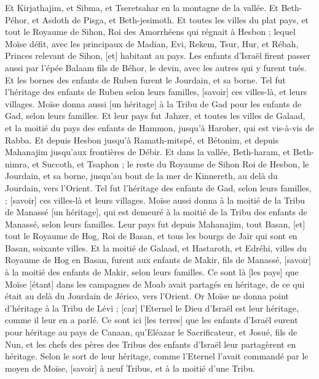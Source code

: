 \begin{multicols}{2}
Et Kirjathajim, et Sibma, et Tseretsahar en la montagne de la vallée.
Et Beth-Péhor, et Asdoth de Pisga, et Beth-jesimoth.
Et toutes les villes du plat pays, et tout le Royaume de Sihon, Roi des Amorrhéens qui régnait à Hesbon ; lequel Moïse défit, avec les principaux de Madian, Evi, Rekem, Tsur, Hur, et Rébah, Princes relevant de Sihon, [et] habitant au pays.
Les enfants d'Israël firent passer aussi par l'épée Balaam fils de Béhor, le devin, avec les autres qui y furent tués.
Et les bornes des enfants de Ruben furent le Jourdain, et sa borne. Tel fut l'héritage des enfants de Ruben selon leurs familles, [savoir] ces villes-là, et leurs villages.
Moïse donna aussi [un héritage] à la Tribu de Gad pour les enfants de Gad, selon leurs familles.
Et leur pays fut Jahzer, et toutes les villes de Galaad, et la moitié du pays des enfants de Hammon, jusqu'à Haroher, qui est vis-à-vis de Rabba.
Et depuis Hesbon jusqu'à Ramath-mitspé, et Bétonim, et depuis Mahanajim jusqu'aux frontières de Débir.
Et dans la vallée, Beth-haram, et Beth-nimra, et Succoth, et Tsaphon ; le reste du Royaume de Sihon Roi de Hesbon, le Jourdain, et sa borne, jusqu'au bout de la mer de Kinnereth, au delà du Jourdain, vers l'Orient.
Tel fut l'héritage des enfants de Gad, selon leurs familles, ; [savoir] ces villes-là et leurs villages.
Moïse aussi donna à la moitié de la Tribu de Manassé [un héritage], qui est demeuré à la moitié de la Tribu des enfants de Manassé, selon leurs familles.
Leur pays fut depuis Mahanajim, tout Basan, [et] tout le Royaume de Hog, Roi de Basan, et tous les bourgs de Jaïr qui sont en Basan, soixante villes.
Et la moitié de Galaad, et Hastaroth, et Edréhi, villes du Royaume de Hog en Basan, furent aux enfants de Makir, fils de Manassé, [savoir] à la moitié des enfants de Makir, selon leurs familles.
Ce sont là [les pays] que Moïse [étant] dans les campagnes de Moab avait partagés en héritage, de ce qui était au delà du Jourdain de Jérico, vers l'Orient.
Or Moïse ne donna point d'héritage à la Tribu de Lévi ; [car] l'Eternel le Dieu d'Israël est leur héritage, comme il leur en a parlé.
\VerseOne{}Ce sont ici [les terres] que les enfants d'Israël eurent pour héritage au pays de Canaan, qu'Eléazar le Sacrificateur, et Josué, fils de Nun, et les chefs des pères des Tribus des enfants d'Israël leur partagèrent en héritage.
Selon le sort de leur héritage, comme l'Eternel l'avait commandé par le moyen de Moïse, [savoir] à neuf Tribus, et à la moitié d'une Tribu.

\end{multicols}
